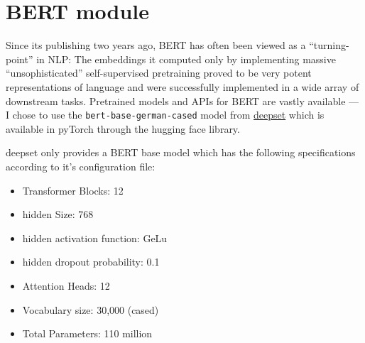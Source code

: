 \begin{landscape}\centering
\end{landscape}


\section{BERT module}

Since its publishing two years ago, BERT \citep{devlin2018bert} has often
been viewed as a ``turning-point'' in NLP: The embeddings it computed only by
implementing massive ``unsophisticated'' self-supervised pretraining proved to
be very potent representations of language and were successfully implemented
in a wide array of downstream tasks. Pretrained models and APIs for BERT are
vastly available --- I chose to use the \texttt{bert-base-german-cased} model
from \href{https://deepset.ai/german-bert}{deepset} which is available in
pyTorch through the hugging face library\cite{wolf2019transformers}.

deepset only provides a BERT base model which has the following specifications according to it's
configuration file:

\begin{itemize}
  \item Transformer Blocks: 12
  \item hidden Size: 768
  \item hidden activation function: GeLu
  \item hidden dropout probability: 0.1
  \item Attention Heads: 12
  \item Vocabulary size: 30,000 (cased)
  \item Total Parameters: 110 million
\end{itemize}

